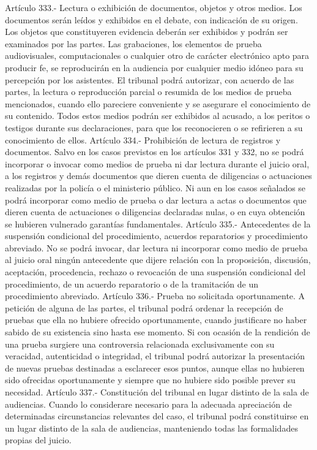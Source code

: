     Artículo 333.- Lectura o exhibición de documentos, objetos y otros medios. Los documentos serán leídos y exhibidos en el debate, con indicación de su origen. Los objetos que constituyeren evidencia deberán ser exhibidos y podrán ser examinados por las partes. Las grabaciones, los elementos de prueba audiovisuales, computacionales o cualquier otro de carácter electrónico apto para producir fe, se reproducirán en la audiencia por cualquier medio idóneo para su percepción por los asistentes. El tribunal podrá autorizar, con acuerdo de las partes, la lectura o reproducción parcial o resumida de los medios de prueba mencionados, cuando ello pareciere conveniente y se asegurare el conocimiento de su contenido. Todos estos medios podrán ser exhibidos al acusado, a los peritos o testigos durante sus declaraciones, para que los reconocieren o se refirieren a su conocimiento de ellos.
    Artículo 334.- Prohibición de lectura de registros y documentos. Salvo en los casos previstos en los artículos 331 y 332, no se podrá incorporar o invocar como medios de prueba ni dar lectura durante el juicio oral, a los registros y demás documentos que dieren cuenta de diligencias o actuaciones realizadas por la policía o el ministerio público.
    Ni aun en los casos señalados se podrá incorporar como medio de prueba o dar lectura a actas o documentos que dieren cuenta de actuaciones o diligencias declaradas nulas, o en cuya obtención se hubieren vulnerado garantías fundamentales.
    Artículo 335.- Antecedentes de la suspensión condicional del procedimiento, acuerdos reparatorios y procedimiento abreviado. No se podrá invocar, dar lectura ni incorporar como medio de prueba al juicio oral ningún antecedente que dijere relación con la proposición, discusión, aceptación, procedencia, rechazo o revocación de una suspensión condicional del procedimiento, de un acuerdo reparatorio o de la tramitación de un procedimiento abreviado.
    Artículo 336.- Prueba no solicitada oportunamente. A petición de alguna de las partes, el tribunal podrá ordenar la recepción de pruebas que ella no hubiere ofrecido oportunamente, cuando justificare no haber sabido de su existencia sino hasta ese momento.
    Si con ocasión de la rendición de una prueba surgiere una controversia relacionada exclusivamente con su veracidad, autenticidad o integridad, el tribunal podrá autorizar la presentación de nuevas pruebas destinadas a esclarecer esos puntos, aunque ellas no hubieren sido ofrecidas oportunamente y siempre que no hubiere sido posible prever su necesidad.
    Artículo 337.- Constitución del tribunal en lugar distinto de la sala de audiencias. Cuando lo considerare necesario para la adecuada apreciación de determinadas circunstancias relevantes del caso, el tribunal podrá constituirse en un lugar distinto de la sala de audiencias, manteniendo todas las formalidades propias del juicio.
